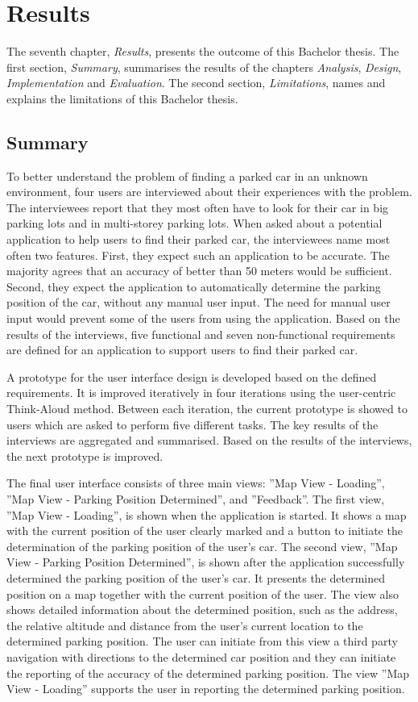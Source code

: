 \chapter{Results}
The seventh chapter, \textit{Results}, presents the outcome of this Bachelor thesis. The first section, \textit{Summary}, summarises the results of the chapters \textit{Analysis}, \textit{Design}, \textit{Implementation} and \textit{Evaluation}. The second section, \textit{Limitations}, names and explains the limitations of this Bachelor thesis. 

\section{Summary}
To better understand the problem of finding a parked car in an unknown environment, four users are interviewed about their experiences with the problem. The interviewees report that they most often have to look for their car in big parking lots and in multi-storey parking lots. When asked about a potential application to help users to find their parked car, the interviewees name most often two features. First, they expect such an application to be accurate. The majority agrees that an accuracy of better than 50 meters would be sufficient. Second, they expect the application to automatically determine the parking position of the car, without any manual user input. The need for manual user input would prevent some of the users from using the application. Based on the results of the interviews, five functional and seven non-functional requirements are defined for an application to support users to find their parked car.

A prototype for the user interface design is developed based on the defined requirements. It is improved iteratively in four iterations using the user-centric Think-Aloud method. Between each iteration, the current prototype is showed to users which are asked to perform five different tasks. The key results of the interviews are aggregated and summarised. Based on the results of the interviews, the next prototype is improved. 

The final user interface consists of three main views: ''Map View - Loading'', ''Map View - Parking Position Determined'', and ''Feedback''. The first view, ''Map View - Loading'', is shown when the application is started. It shows a map with the current position of the user clearly marked and a button to initiate the determination of the parking position of the user's car. The second view, ''Map View - Parking Position Determined'', is shown after the application successfully determined the parking position of the user's car. It presents the determined position on a map together with the current position of the user. The view also shows detailed information about the determined position, such as the address, the relative altitude and distance from the user's current location to the determined parking position. The user can initiate from this view a third party navigation with directions to the determined car position and they can initiate the reporting of the accuracy of the determined parking position. The view ''Map View - Loading'' supports the user in reporting the determined parking position.


